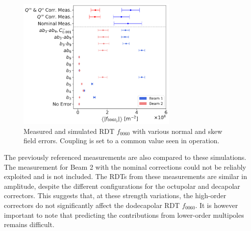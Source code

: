 \begin{figure}[!htb]
    \centering
    \includegraphics[width=0.7\textwidth]{./images/simulations_f0060.pdf}
    \caption{Measured and simulated RDT $f_{0060}$ with various normal and skew field errors.
    Coupling is set to a common value seen in operation.}
    \label{fig:high_orders:simulations_f0060}
\end{figure}

The previously referenced measurements are also compared to these simulations. The measurement for
Beam 2 with the nominal corrections could not be reliably exploited and is not included.  The RDTs
from these measurements are similar in amplitude, despite the different configurations for the
octupolar and decapolar correctors. This suggests that, at these strength variations, the high-order
correctors do not significantly affect the dodecapolar RDT $f_{0060}$. It is however important to
note that predicting the contributions from lower-order multipoles remains difficult.